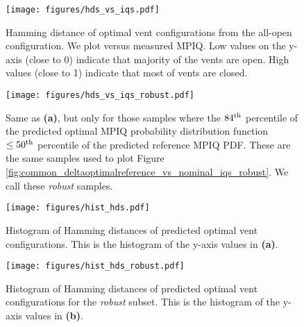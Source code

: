 \begin{figure*}
\begin{subfigure}{0.49\textwidth}
    \centering
    \texttt{[image: figures/hds\_vs\_iqs.pdf]}
    \caption{Hamming distance of optimal vent configurations from the all-open configuration.  We plot versus measured MPIQ. Low values on the y-axis (close to 0) indicate that majority of the vents are open.  High values (close to 1) indicate that most of vents are closed.}%
    \label{fig:common_hds_vs_iqs}
\end{subfigure}
\hfill
\begin{subfigure}{0.49\textwidth}
    \centering
    \texttt{[image: figures/hds\_vs\_iqs\_robust.pdf]}
    \caption{Same as \textbf{(a)}, but only for those samples where the $84^{\rm th}$ percentile of the predicted optimal MPIQ probability distribution function $\leq 50^{\rm th}$ percentile of the predicted reference MPIQ PDF. These are the same samples used to plot Figure \ref{fig:common_deltaoptimalreference_vs_nominal_iqs_robust}. We call these {\it robust} samples.}%
    \label{fig:common_hds_vs_iqs_robust}
\end{subfigure}
\newline
\begin{subfigure}{0.49\textwidth}
    \centering
    \texttt{[image: figures/hist\_hds.pdf]}
    \caption{Histogram of Hamming distances of predicted optimal vent configurations. This is the histogram of the y-axis values in \textbf{(a)}.}%
    \label{fig:vae_hist_hds}
\end{subfigure}
\hfill
\begin{subfigure}{0.49\textwidth}
    \centering
    \texttt{[image: figures/hist\_hds\_robust.pdf]}
    \caption{Histogram of Hamming distances of predicted optimal vent configurations for the {\it robust} subset. This is the histogram of the y-axis values in \textbf{(b)}.}%
    \label{fig:vae_hist_hds_robust}
\end{subfigure}

\end{figure*}
